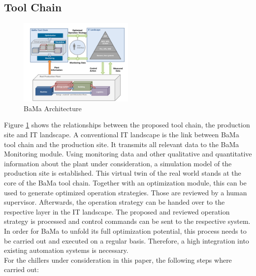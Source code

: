 \documentclass[3p,times,procedia,twocolumn,twoside]{elsarticle}
\begin{document}
\subsection{Tool Chain}
\label{CHAP_ToolChain}
\begin{figure}
	\includegraphics[width=0.5\textwidth]{figures/Architecture_new}
	\caption{BaMa Architecture}
	\label{FIG_Architecture}
\end{figure}
Figure \ref{FIG_Architecture} shows the relationships between the proposed tool chain, the production site and IT landscape. A conventional IT landscape is the link between BaMa tool chain and the production site. It transmits all relevant data to the BaMa Monitoring module. Using monitoring data and other qualitative and quantitative information about the plant under consideration, a simulation model of the production site is established. This virtual twin of the real world stands at the core of the BaMa tool chain. Together with an optimization module, this can be used to generate optimized operation strategies. Those are reviewed by a human supervisor. Afterwards, the operation strategy can be handed over to the respective layer in the IT landscape. The proposed and reviewed operation strategy is processed and  control commands can be sent to the respective system. In order for BaMa to unfold its full optimization potential, this process needs to be carried out and executed on a regular basis. Therefore, a high integration into existing automation systems is necessary. \\
For the chillers under consideration in this paper, the following steps where carried out:
\end{document}
